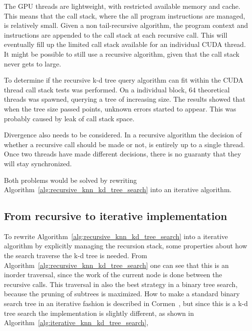 The GPU threads are lightweight, with restricted available memory and cache. This means that the call stack, where the all program instructions are managed, is relatively small. Given a non tail-recursive algorithm, the program context and instructions are appended to the call stack at each recursive call. This will eventually fill up the limited call stack available for an individual CUDA thread. It might be possible to still use a recursive algorithm, given that the call stack never gets to large.

To determine if the recursive k-d tree query algorithm can fit within the CUDA thread call stack tests was performed. On a individual block, $64$ theoretical threads was spawned, querying a tree of increasing size. The results showed that when the tree size passed  points, unknown errors started to appear. This was probably caused by leak of call stack space.

Divergence also needs to be considered. In a recursive algorithm the decision of whether a recursive call should be made or not, is entirely up to a single thread. Once two threads have made different decisions, there is no guaranty that they will stay synchronized.

Both problems would be solved by rewriting Algorithm~\ref{alg:recursive_knn_kd_tree_search} into an iterative algorithm.

\subsection{From recursive to iterative implementation} %
\label{sub:from_recursive_to_iterative_implementation}

To rewrite Algorithm~\ref{alg:recursive_knn_kd_tree_search} into a iterative algorithm by explicitly managing the recursion stack, some properties about how the search traverse the k-d tree is needed. From Algorithm~\ref{alg:recursive_knn_kd_tree_search} one can see that this is an inorder traversal, since the work of the current node is done between the recursive calls. This traversal in also the best strategy in a binary tree search, because the pruning of subtrees is maximized. How to make a standard binary search tree in an iterative fashion is described in Cormen~\citep[Chapter 12]{Cormen:2001}, but since this is a k-d tree search the implementation is slightly different, as shown in Algorithm~\ref{alg:iterative_knn_kd_tree_search},

